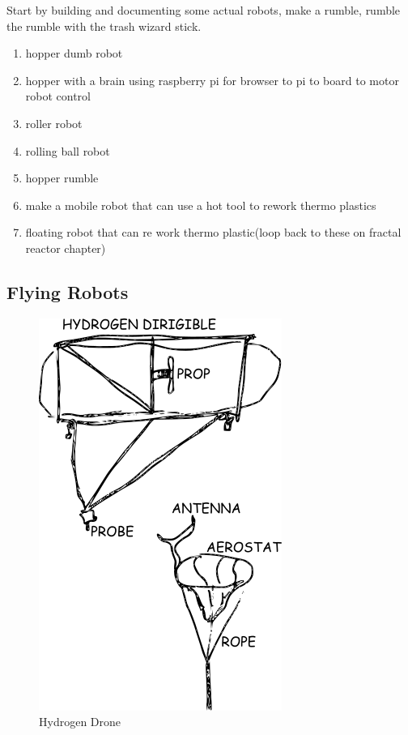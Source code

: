 Start by building and documenting some actual robots, make a rumble,
rumble the rumble with the trash wizard stick.

\begin{enumerate}
\def\labelenumi{\arabic{enumi}.}
\tightlist
\item
  hopper dumb robot
\item
  hopper with a brain using raspberry pi for browser to pi to board to
  motor robot control
\item
  roller robot
\item
  rolling ball robot
\item
  hopper rumble
\item
  make a mobile robot that can use a hot tool to rework thermo plastics
\item
  floating robot that can re work thermo plastic(loop back to these on
  fractal reactor chapter)
\end{enumerate}

\subsection{Flying Robots}\label{flying-robots}

\begin{figure}[htbp]
\centering
\includegraphics{images/dirigible.png}
\caption{Hydrogen Drone}
\end{figure}

